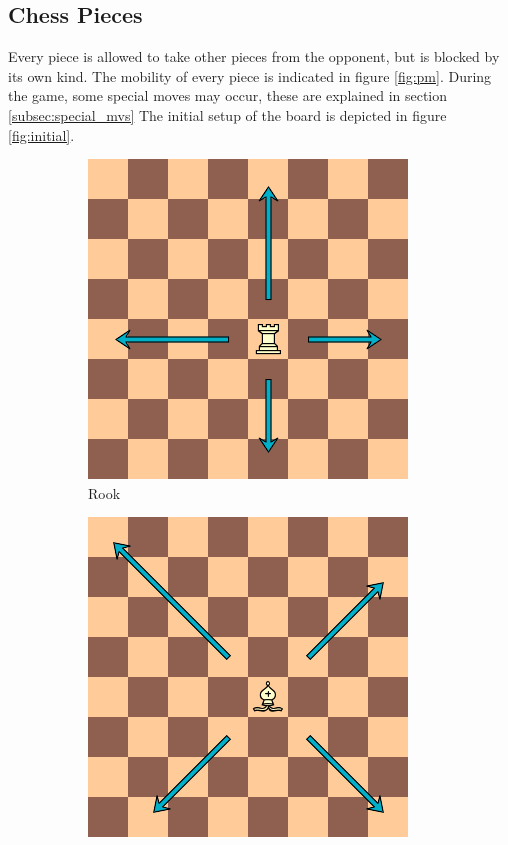 \subsection{Chess Pieces}
\label{subsec:cp}
Every piece is allowed to take other pieces from the opponent, but is blocked by its own kind.
The mobility of every piece is indicated in figure \ref{fig:pm}. During the game, some special moves may occur, these are explained in section \ref{subsec:special_mvs} The initial setup of the board is depicted in figure \ref{fig:initial}.

\begin{figure}
    \centering
    \begin{subfigure}[b]{0.4\textwidth}
        \includegraphics[scale=0.5]{fig/rules/rook}
        \caption{Rook}
        \label{fig:rook}
    \end{subfigure}
    \qquad
    \begin{subfigure}[b]{0.4\textwidth}
         \includegraphics[scale=0.5]{fig/rules/bishop}

\end{subfigure}
\end{figure}
